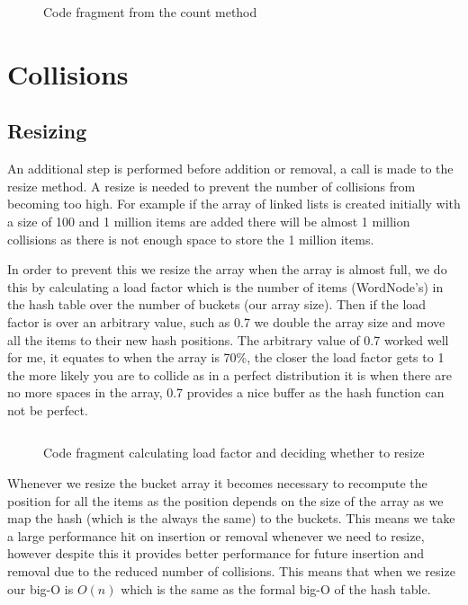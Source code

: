 \documentclass[12pt]{article}
\begin{document}
\begin{figure}[!htp]
\centering
{}
\caption{Code fragment from the count method}
\label{lst:count_method}
\end{figure}

\section{Collisions}
\subsection{Resizing}
An additional step is performed before addition or removal, a call is made to the resize method. A resize is needed to prevent the number of collisions from becoming too high. For example if the array of linked lists is created initially with a size of 100 and 1 million items are added there will be almost 1 million collisions as there is not enough space to store the 1 million items.

In order to prevent this we resize the array when the array is almost full, we do this by calculating a load factor which is the number of items (WordNode's) in the hash table over the number of buckets (our array size). Then if the load factor is over an arbitrary value, such as 0.7 we double the array size and move all the items to their new hash positions. The arbitrary value of 0.7 worked well for me, it equates to when the array is 70\%, the closer the load factor gets to 1 the more likely you are to collide as in a perfect distribution it is when there are no more spaces in the array, 0.7 provides a nice buffer as the hash function can not be perfect.

\begin{figure}[!htp]
\centering
\inputminted[mathescape,breaklines=true,fontsize=\footnotesize,baselinestretch=0.8,firstline=39,lastline=45]{java}{../src/main/java/com/ryanwelch/wordstore/WordStoreHashTableImp.java}
\caption{Code fragment calculating load factor and deciding whether to resize}
\label{lst:load_factor_code}
\end{figure}

Whenever we resize the bucket array it becomes necessary to recompute the position for all the items as the position depends on the size of the array as we map the hash (which is the always the same) to the buckets. This means we take a large performance hit on insertion or removal whenever we need to resize, however despite this it provides better performance for future insertion and removal due to the reduced number of collisions. This means that when we resize our big-O is $O(n)$ which is the same as the formal big-O of the hash table.
\end{document}
